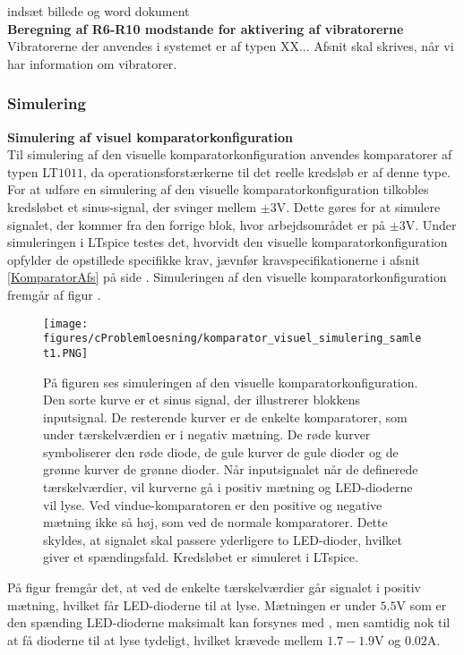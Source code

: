 indsæt billede og word dokument \\

\noindent\textbf{Beregning af R6-R10 modstande for aktivering af vibratorerne} \\
Vibratorerne der anvendes i systemet er af typen XX... Afsnit skal skrives, når vi har information om vibratorer.  \\

\subsubsection{Simulering}
\noindent\textbf{Simulering af visuel komparatorkonfiguration} \\
Til simulering af den visuelle komparatorkonfiguration anvendes komparatorer af typen LT$1011$, da operationsforstærkerne til det reelle kredsløb er af denne type. For at udføre en simulering af den visuelle komparatorkonfiguration tilkobles kredsløbet et sinus-signal, der svinger mellem $\pm3$V. Dette gøres for at simulere signalet, der kommer fra den forrige blok, hvor arbejdsområdet er på $\pm3$V. Under simuleringen i LTspice testes det, hvorvidt den visuelle komparatorkonfiguration opfylder de opstillede specifikke krav, jævnfør kravspecifikationerne i afsnit \ref{KomparatorAfs} på side \pageref{KomparatorAfs}. Simuleringen af den visuelle komparatorkonfiguration fremgår af figur . 
\begin{figure}[H]
	\centering
	\texttt{[image: figures/cProblemloesning/komparator\_visuel\_simulering\_samlet1.PNG]}
	\caption{På figuren ses simuleringen af den visuelle komparatorkonfiguration. Den sorte kurve er et sinus signal, der illustrerer blokkens inputsignal. De resterende kurver er de enkelte komparatorer, som under tærskelværdien er i negativ mætning. De røde kurver symboliserer den røde diode, de gule kurver de gule dioder og de grønne kurver de grønne dioder. Når inputsignalet når de definerede tærskelværdier, vil kurverne gå i positiv mætning og LED-dioderne vil lyse. Ved vindue-komparatoren er den positive og negative mætning ikke så høj, som ved de normale komparatorer. Dette skyldes, at signalet skal passere yderligere to LED-dioder, hvilket giver et spændingsfald. Kredsløbet er simuleret i LTspice.}
	\label{fig:komparator_visuel_simulering_samlet}
\end{figure}
På figur  fremgår det, at ved de enkelte tærskelværdier går signalet i positiv mætning, hvilket får LED-dioderne til at lyse. Mætningen er under $5.5$V som er den spænding LED-dioderne maksimalt kan forsynes med  , men samtidig nok til at få dioderne til at lyse tydeligt, hvilket krævede mellem $1.7-1.9$V og $0.02$A. 

